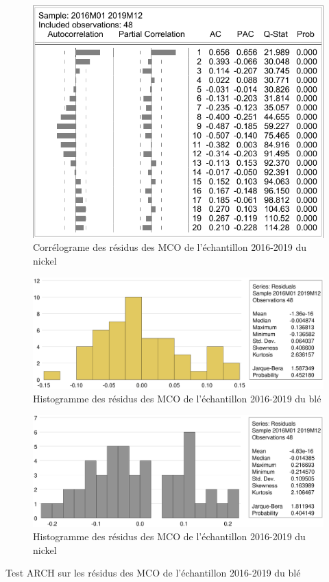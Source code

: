 \documentclass[12pt,a4paper]{article}
\begin{document}
\begin{figure}[H]
    \centering
    \includegraphics[]{annexe/3_1_extra_cor_nickel19.pdf}
    \caption{Corrélograme des résidus des MCO de l'échantillon 2016-2019 du nickel}
\end{figure}

\begin{figure}[H]
    \centering
    \includegraphics[width=\textwidth]{annexe/3_1_extra_hist_ble19.eps}
    \caption{Histogramme des résidus des MCO de l'échantillon 2016-2019 du blé}
\end{figure}
\vspace{-1.2cm}
\begin{figure}[H]
    \centering
    \includegraphics[width=\textwidth]{annexe/3_1_extra_hist_nickel19.eps}
    \caption{Histogramme des résidus des MCO de l'échantillon 2016-2019 du nickel}
\end{figure}
\vspace{-0.5cm}
\begin{table}[H]
    \centering
    \caption{Test ARCH sur les résidus des MCO de l'échantillon 2016-2019 du blé}
    \sffamily
    \resizebox{0.6\textwidth}{!}{}
\end{table}
\end{document}

